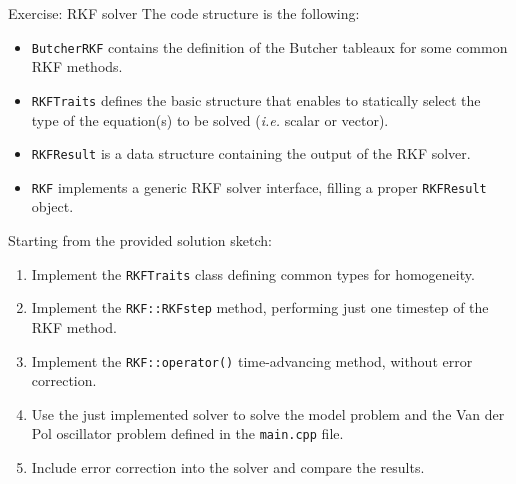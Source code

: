 \documentclass[10pt]{beamer}
\begin{document}
\begin{frame}{Exercise: RKF solver}
The code structure is the following:
\begin{itemize}
\item \texttt{ButcherRKF} contains the definition of the Butcher tableaux for some common RKF methods.
\item \texttt{RKFTraits} defines the basic structure that enables to statically select the type of the equation(s) to be solved (\textit{i.e.} scalar or vector).
\item \texttt{RKFResult} is a data structure containing the output of the RKF solver.
\item \texttt{RKF} implements a generic RKF solver interface, filling a proper \texttt{RKFResult} object.
\end{itemize}
\vfill
Starting from the provided solution sketch:
\begin{enumerate}
\item Implement the \texttt{RKFTraits} class defining common types for homogeneity.
\item Implement the \texttt{RKF::RKFstep} method, performing just one timestep of the RKF method.
\item Implement the \texttt{RKF::operator()} time-advancing method, without error correction.
\item Use the just implemented solver to solve the model problem and the Van der Pol oscillator problem defined in the \texttt{main.cpp} file.
\item Include error correction into the solver and compare the results.
\end{enumerate}
\end{frame}
\end{document}
